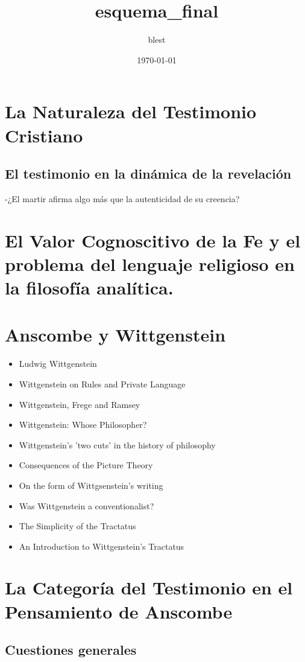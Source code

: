 \documentclass[11pt]{article}
\author{blest}
\date{\today}
\title{esquema\_final}
\begin{document}
\maketitle
\tableofcontents

\section{La Naturaleza del Testimonio Cristiano}
\label{sec-1}
\subsection{El testimonio en la dinámica de la revelación}
\label{sec-1-1}

-¿El martir afirma algo más que la autenticidad de su creencia?


\section{El Valor Cognoscitivo de la Fe y el problema del lenguaje religioso en la filosofía analítica.}
\label{sec-2}

\section{Anscombe y Wittgenstein}
\label{sec-3}
\begin{itemize}
\item Ludwig Wittgenstein
\item Wittgenstein on Rules and Private Language
\item Wittgenstein, Frege and Ramsey
\item Wittgenstein: Whose Philosopher?
\item Wittgenstein's 'two cuts' in the history of philosophy
\item Consequences of the Picture Theory
\item On the form of Wittgsenstein's writing
\item Was Wittgenstein a conventionalist?
\item The Simplicity of the Tractatus
\item An Introduction to Wittgenstein's Tractatus
\end{itemize}

\section{La Categoría del Testimonio en el Pensamiento de Anscombe}
\label{sec-4}
\subsection{Cuestiones generales}
\label{sec-4-1}
\end{document}
